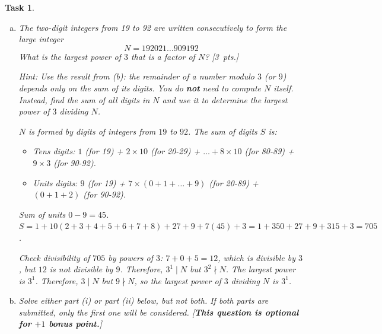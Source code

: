 \documentclass[11pt,twoside,a4paper]{article}
\theoremstyle{exercise}
\newtheorem{exercise}{Task}
\begin{document}
\begin{exercise}
\begin{enumerate}[(a)]
\vspace{0.3cm}
Let $n = \sum_{i=0}^{k} d_i 10^i$. Since $10 \equiv 1 \pmod 9$, then $10^i \equiv 1^i \equiv 1 \pmod 9$ for all $i$.
\begin{align*}
n &= d_k 10^k + d_{k-1} 10^{k-1} + \dots + d_1 10 + d_0 \\
n &\equiv d_k(1) + d_{k-1}(1) + \dots + d_1(1) + d_0 \pmod 9 \\
n &\equiv \sum_{i=0}^{k} d_i \pmod 9
\end{align*}
Thus, $9 \mid n$ if and only if $9 \mid \sum_{i=0}^k d_i$.

\vspace{0.4cm}

\item The two-digit integers from 19 to 92 are written consecutively to form the large integer
$$N=192021\dots 909192$$ What is the largest power of $3$ that is a factor of $N$? \hfill [3~pts.]

\textit{Hint:} Use the result from (b): the remainder of a number modulo $3$ (or $9$) depends only on the sum of its digits. 
You do \textbf{not} need to compute $N$ itself. Instead, find the sum of all digits in $N$ and use it to determine the largest power of $3$ dividing $N$.

\vspace{0.3cm}
$N$ is formed by digits of integers from $19$ to $92$.
The sum of digits $S$ is:
\begin{itemize}
    \item Tens digits: $1$ (for 19) + $2 \times 10$ (for 20-29) + $\dots + 8 \times 10$ (for 80-89) + $9 \times 3$ (for 90-92).
    \item Units digits: $9$ (for 19) + $7 \times (0+1+\dots+9)$ (for 20-89) + $(0+1+2)$ (for 90-92).
\end{itemize}
Sum of units $0-9 = 45$.
$S = 1 + 10(2+3+4+5+6+7+8) + 27 + 9 + 7(45) + 3 = 1 + 350 + 27 + 9 + 315 + 3 = 705$.


Check divisibility of $705$ by powers of $3$:
$7+0+5 = 12$, which is divisible by $3$, but $12$ is not divisible by $9$.
Therefore, $3^1 \mid N$ but $3^2 \nmid N$. The largest power is $3^1$.
Therefore, \(3 \mid N\) but \(9 \nmid N\), so the largest power of \(3\) dividing \(N\) is \(3^1\).

\vspace{0.3cm}

\item Solve either part (i) or part (ii) below, but not both. If both parts are submitted, only the first one will be considered. [\textbf{This question is optional for $+1$ bonus point.}]



\end{enumerate}
\end{exercise}
\end{document}
